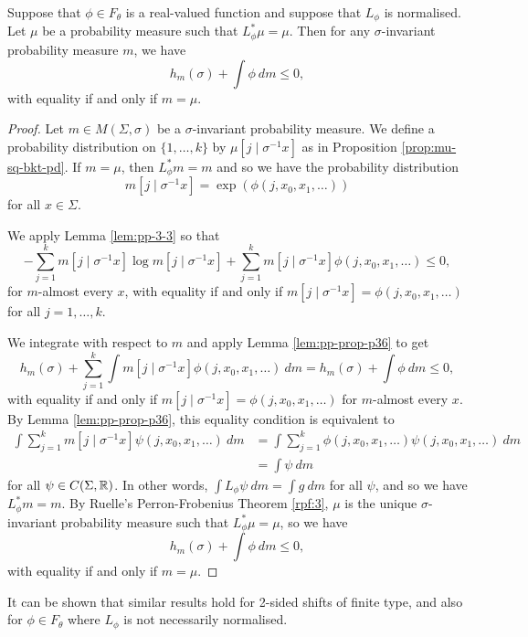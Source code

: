 \begin{lemma} \label{lem:pp-prop-3-4}
	Suppose that $\phi \in F_\theta$ is a real-valued function and suppose that $L_\phi$ is normalised. Let $\mu$ be a probability measure such that $L_\phi^*{\mu} = \mu$. Then for any $\sigma$-invariant probability measure $m$, we have
	\[
		h_m(\sigma) + \int{\phi\ dm} \leq 0,
	\]
	with equality if and only if $m = \mu$.
	\begin{proof}
		Let $m \in M(\Sigma, \sigma)$ be a $\sigma$-invariant probability measure. We define a probability distribution on $\{1, \dots, k\}$ by $\mu[j \mid \sigma^{-1}{x}]$ as in Proposition \ref{prop:mu-sq-bkt-pd}. If $m = \mu$, then $L_\phi^*{m} = m$ and so we have the probability distribution
		\[
			m[j \mid \sigma^{-1}{x}] = \exp(\phi(j, x_0, x_1, \dots))
		\]
		for all $x \in \Sigma$.
		
		We apply Lemma \ref{lem:pp-3-3} so that
		\[
			-\sum_{j = 1}^k{m[j \mid \sigma^{-1}{x}] \log{m[j \mid \sigma^{-1}{x}]}} + \sum_{j = 1}^k{m[j \mid \sigma^{-1}{x}] \phi(j, x_0, x_1, \dots)} \leq 0,
		\]
		for $m$-almost every $x$, with equality if and only if $m[j \mid \sigma^{-1}{x}] = \phi(j, x_0, x_1, \dots)$ for all $j = 1, \dots, k$.
		
		We integrate with respect to $m$ and apply Lemma \ref{lem:pp-prop-p36} to get
		\[
			h_m(\sigma) + \sum_{j = 1}^k{\int{m[j \mid \sigma^{-1}{x}] \phi(j, x_0, x_1, \dots)\ dm}} = h_m(\sigma) + \int{\phi\ dm} \leq 0,
		\]
		with equality if and only if $m[j \mid \sigma^{-1}{x}] = \phi(j, x_0, x_1, \dots)$ for $m$-almost every $x$. By Lemma \ref{lem:pp-prop-p36}, this equality condition is equivalent to
		\begin{align*}
			\int{\sum_{j = 1}^k{m[j \mid \sigma^{-1}{x}] \psi(j, x_0, x_1, \dots)}\ dm} &= \int{\sum_{j = 1}^k{\phi(j, x_0, x_1, \dots) \psi(j, x_0, x_1, \dots)}\ dm} \\
				&= \int{\psi\ dm}
		\end{align*}
		for all $\psi \in C(\Sigma, \mathbb{R})$. In other words, $\int{L_\phi{\psi}\ dm} = \int{g\ dm}$ for all $\psi$, and so we have $L_\phi^*{m} = m$. By Ruelle's Perron-Frobenius Theorem \ref{rpf:3}, $\mu$ is the unique $\sigma$-invariant probability measure such that $L_\phi^*{\mu} = \mu$, so we have
		\[
			h_m(\sigma) + \int{\phi\ dm} \leq 0,
		\]
		with equality if and only if $m = \mu$.
	\end{proof}
\end{lemma}

It can be shown that similar results hold for 2-sided shifts of finite type, and also for $\phi \in F_\theta$ where $L_\phi$ is not necessarily normalised.

